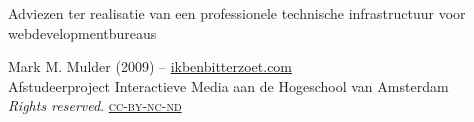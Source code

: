 \thispagestyle{empty}

\begin{flushleft}

  \Huge
  Adviezen ter realisatie van een professionele technische infrastructuur voor webdevelopmentbureaus\\

  \vfill{}
  
  \small
  Mark M. Mulder (2009) -- \href{http://www.ikbenbitterzoet.com/}{ikbenbitterzoet.com}\\
  Afstudeerproject Interactieve Media aan de Hogeschool van Amsterdam
  \\\emph{Rights reserved}.  \href{http://creativecommons.org/licenses/by-nc-nd/3.0/nl/}{\textsc{cc-by-nc-nd}}
  
\end{flushleft}

\normalsize
